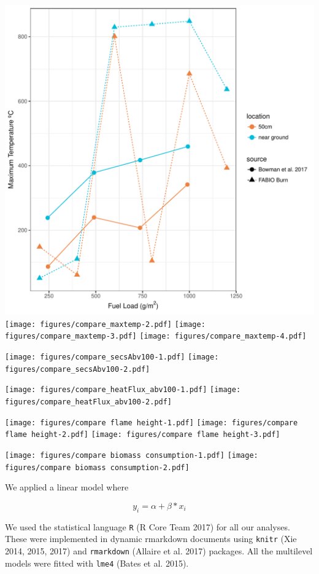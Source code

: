 \documentclass[11pt,a4paper]{article}
\begin{document}
\includegraphics{figures/compare_maxtemp-1.pdf}
\texttt{[image: figures/compare\_maxtemp-2.pdf]}
\texttt{[image: figures/compare\_maxtemp-3.pdf]}
\texttt{[image: figures/compare\_maxtemp-4.pdf]}

\texttt{[image: figures/compare\_secsAbv100-1.pdf]}
\texttt{[image: figures/compare\_secsAbv100-2.pdf]}

\texttt{[image: figures/compare\_heatFlux\_abv100-1.pdf]}
\texttt{[image: figures/compare\_heatFlux\_abv100-2.pdf]}

\texttt{[image: figures/compare flame height-1.pdf]}
\texttt{[image: figures/compare flame height-2.pdf]}
\texttt{[image: figures/compare flame height-3.pdf]}

\texttt{[image: figures/compare biomass consumption-1.pdf]}
\texttt{[image: figures/compare biomass consumption-2.pdf]}

We applied a linear model where

\[
y_{i} = \alpha + \beta*x_{i} 
\]

We used the statistical language \texttt{R} (R Core Team 2017) for all
our analyses. These were implemented in dynamic rmarkdown documents
using \texttt{knitr} (Xie 2014, 2015, 2017) and \texttt{rmarkdown}
(Allaire et al. 2017) packages. All the multilevel models were fitted
with \texttt{lme4} (Bates et al. 2015).
\end{document}
